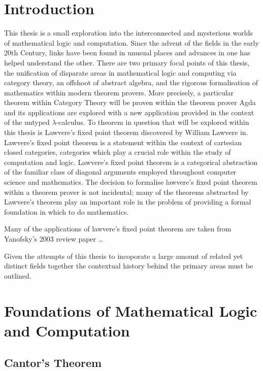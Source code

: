 
\section{Introduction}

This thesis is a small exploration into the interconnected and mysterious worlds
of mathematical logic and computation. Since the advent of the fields in the
early 20th Century, links have been found in unusual places and advances in one
has helped understand the other. There are two primary focal points of this
thesis, the unification of disparate areas in mathematical logic and computing
via category theory, an offshoot of abstract algebra, and the rigorous
formalisation of mathematics within modern theorem provers. More precisely, a
particular theorem within Category Theory will be proven within the theorem
prover Agda and its applications are explored with a new application provided in
the context of the untyped $\lambda$-calculus. To theorem in question that will
be explored within this thesis is Lawvere's fixed point theorem discovered by
William Lawvere in. Lawvere's fixed point theorem is a statement
within the context of cartesian closed categories, categories which play a
crucial role within the study of computation and logic. Lawvere's fixed point
theorem is a categorical abstraction of the familiar class of diagonal arguments
employed throughout computer science and mathematics. The decision to formalise
lawvere's fixed point theorem within a theorem prover is not incidental; many of
the theorems abstracted by Lawvere's theorem play an important role in the
problem of providing a formal foundation in which to do mathematics.

Many of the applications of lawvere's fixed point theorem are taken from
Yanofsky's 2003 review paper \ldots {}

Given the attempts of this thesis to incoporate a large amount of related yet
distinct fields together the contextual history behind the primary areas must be
outlined.

\section{Foundations of Mathematical Logic and Computation}

\subsection{Cantor's Theorem}

